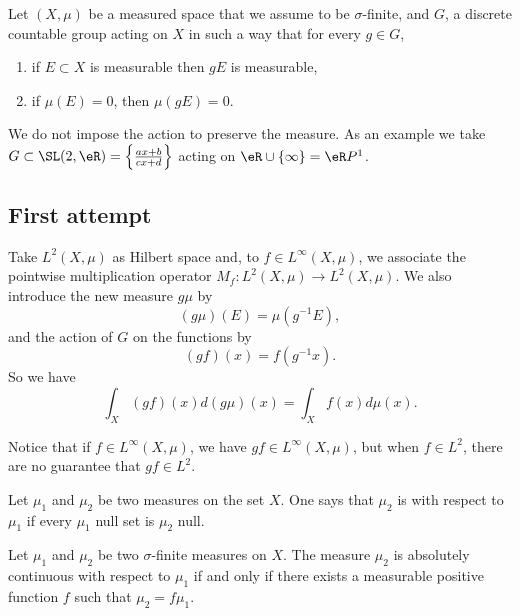 Let $(X,\mu)$ be a measured space that we assume to be $\sigma$-finite, and $G$, a discrete countable group acting on $X$ in such a way that for every $g\in G$,
\begin{enumerate}
	\item if $E\subset X$ is measurable then $gE$ is measurable,
	\item if $\mu(E)=0$, then $\mu(gE)=0$.
\end{enumerate}
We do not impose the action to preserve the measure. As an example we take $G\subset\SL(2,\eR)=\left\{ \frac{ ax+b }{ cx+d } \right\}$ acting on $\eR\cup\{ \infty\}=\eR P^1$.

\subsection{First attempt}

Take $L^2(X,\mu)$ as Hilbert space and, to $f\in  L^{\infty}(X,\mu)$, we associate the pointwise multiplication operator $M_f\colon  L^2(X,\mu)\to  L^2 (X,\mu)$. We also introduce the new measure $g\mu$ by
\begin{equation}
	(g\mu)(E)=\mu(g^{-1}E),
\end{equation}
and the action of $G$ on the functions by
\begin{equation}
	(gf)(x)=f(g^{-1}x).
\end{equation}
So we have
\begin{equation}
	\int_X (gf)(x)d(g\mu)(x)=\int_X f(x)d\mu(x).
\end{equation}

Notice that if $f\in L^{\infty}(X,\mu)$, we have $gf\in L^{\infty}(X,\mu)$, but when $f\in  L^2$, there are no guarantee that $gf\in  L^2$.

Let $\mu_1$ and $\mu_2$ be two measures on the set $X$. One says that $\mu_2$ is  with respect to $\mu_1$ if every $\mu_1$ null set is $\mu_2$ null.

\begin{theorem}		\label{ThoRadonNikodym}
	Let $\mu_1$ and $\mu_2$ be two $\sigma$-finite measures on $X$. The measure $\mu_2$ is absolutely continuous with respect to $\mu_1$ if and only if there exists a measurable positive function $f$ such that $\mu_2=f\mu_1$.
\end{theorem}

